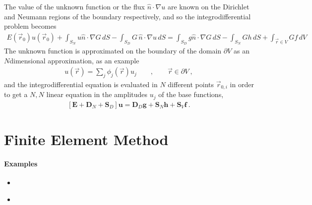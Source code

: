 \documentclass[letterpaper,10pt,english]{jupyterBook}
\begin{document}
\sphinxAtStartPar
The value of the unknown function or the flux \(\hat{n} \cdot \nabla u\) are known on the Dirichlet and Neumann regions of the boundary respectively, and so the integro\sphinxhyphen{}differential problem becomes
\begin{equation*}
\begin{split}E(\vec{r}_0) u(\vec{r}_0) + \int_{S_N} u \hat{n} \cdot \nabla G \, dS - \int_{S_D} G \, \hat{n} \cdot \nabla u \, dS = \int_{S_D} g \hat{n} \cdot \nabla G \, dS - \int_{S_N} G h \, dS + \int_{\vec{r} \in V} G f \, dV\end{split}
\end{equation*}
\sphinxAtStartPar
The unknown function is approximated on the boundary of the domain \(\partial V\) as an \(N\)\sphinxhyphen{}dimensional approximation, as an example
\begin{equation*}
\begin{split}u(\vec{r}) = \sum_{j} \phi_j(\vec{r}) u_j \qquad , \qquad \vec{r} \in \partial V \ ,\end{split}
\end{equation*}
\sphinxAtStartPar
and the integro\sphinxhyphen{}differential equation is evaluated in \(N\) different points \(\vec{r}_{0,i}\) in order to get a \(N,N\) linear equation in the amplitudes \(u_j\) of the base functions,
\begin{equation*}
\begin{split}\left[\mathbf{E} + \mathbf{D}_N + \mathbf{S}_D \right] \mathbf{u} = \mathbf{D}_D \mathbf{g} + \mathbf{S}_N \mathbf{h} + \mathbf{S}_V \mathbf{f} \ .\end{split}
\end{equation*}
\sphinxstepscope


\chapter{Finite Element Method}
\label{\detokenize{ch/pde/fem:finite-element-method}}\label{\detokenize{ch/pde/fem:pde-fem}}\label{\detokenize{ch/pde/fem::doc}}\subsubsection*{Examples}
\begin{itemize}
\item {} 
\sphinxAtStartPar
{}

\item {} 
\sphinxAtStartPar
{\hyperref[\detokenize{ch/pde/fem-poisson-1d:pde-fem-poisson-1d}]{}}

\end{itemize}
\end{document}
